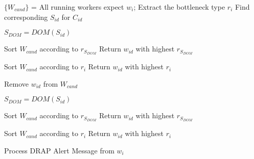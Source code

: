 \begin{algorithm}[ht]
\begin{algorithmic}[1]

\STATE $\{W_{cand}\}$ = All running workers expect $w_i$;
\STATE Extract the bottleneck type $r_i$
\STATE Find corresponding $S_{id}$ for $C_{id}$



  \STATE $S_{DOM} = DOM(S_{id})$
  
  
\STATE Sort $W_{cand}$ according to $r_{S_{DOM}}$
\STATE Return $w_{id}$ with highest $r_{S_{DOM}}$

\ELSE
\STATE Sort $W_{cand}$ according to $r_i$
\STATE Return $w_{id}$ with highest $r_i$

\ENDIF

  \ELSE
  \STATE Remove $w_{id}$ from $W_{cand}$
  \ENDIF
  \ENDFOR
  
  \STATE $S_{DOM} = DOM(S_{id})$
  
  
\STATE Sort $W_{cand}$ according to $r_{S_{DOM}}$
\STATE Return $w_{id}$ with highest $r_{S_{DOM}}$

\ELSE
\STATE Sort $W_{cand}$ according to $r_i$
\STATE Return $w_{id}$ with highest $r_i$

\ENDIF
  
\ENDIF



\end{algorithmic}
\caption{Process DRAP Alert Message from $w_i$}
\label{alg:migrate}
\end{algorithm}
